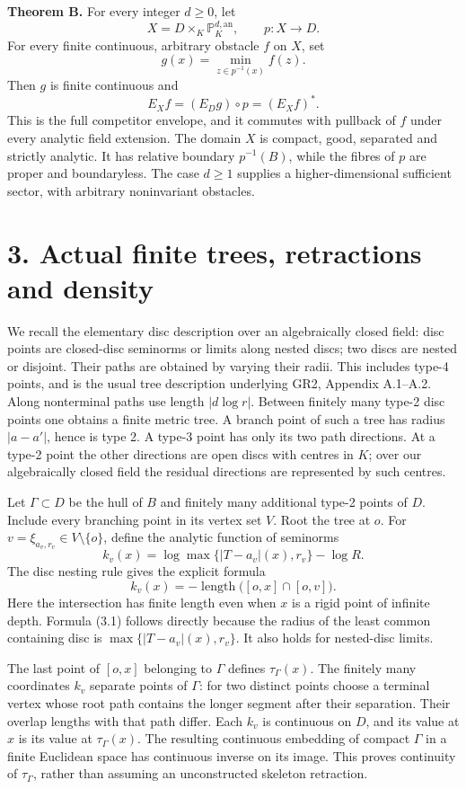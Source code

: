 \documentclass[11pt]{article}
\begin{document}
\textbf{Theorem B.} For every integer \(d\geq0\), let
\[
X=D\times_K\mathbb P^{d,\mathrm{an}}_K,\qquad p:X\to D.
\]
For every finite continuous, arbitrary obstacle \(f\) on \(X\), set
\[
g(x)=\min_{z\in p^{-1}(x)}f(z).
\]
Then \(g\) is finite continuous and
\[
E_Xf=(E_Dg)\circ p=(E_Xf)^*.
\]
This is the full competitor envelope, and it commutes with pullback of \(f\) under every analytic field extension. The domain \(X\) is compact, good, separated and strictly analytic. It has relative boundary \(p^{-1}(B)\), while the fibres of \(p\) are proper and boundaryless. The case \(d\geq1\) supplies a higher-dimensional sufficient sector, with arbitrary noninvariant obstacles.

\section*{3. Actual finite trees, retractions and density}

We recall the elementary disc description over an algebraically closed field: disc points are closed-disc seminorms or limits along nested discs; two discs are nested or disjoint. Their paths are obtained by varying their radii. This includes type-4 points, and is the usual tree description underlying GR2, Appendix A.1--A.2. Along nonterminal paths use length \(|d\log r|\). Between finitely many type-2 disc points one obtains a finite metric tree. A branch point of such a tree has radius \(|a-a'|\), hence is type 2. A type-3 point has only its two path directions. At a type-2 point the other directions are open discs with centres in \(K\); over our algebraically closed field the residual directions are represented by such centres.

Let \(\Gamma\subset D\) be the hull of \(B\) and finitely many additional type-2 points of \(D\). Include every branching point in its vertex set \(V\). Root the tree at \(o\). For \(v=\xi_{a_v,r_v}\in V\setminus\{o\}\), define the analytic function of seminorms
\[
k_v(x)=\log\max\{|T-a_v|(x),r_v\}-\log R.
\]
The disc nesting rule gives the explicit formula
\[
k_v(x)=-\operatorname{length}\bigl([o,x]\cap[o,v]\bigr).
\tag{3.1}
\]
Here the intersection has finite length even when \(x\) is a rigid point of infinite depth. Formula (3.1) follows directly because the radius of the least common containing disc is \(\max\{|T-a_v|(x),r_v\}\). It also holds for nested-disc limits.

The last point of \([o,x]\) belonging to \(\Gamma\) defines \(\tau_\Gamma(x)\). The finitely many coordinates \(k_v\) separate points of \(\Gamma\): for two distinct points choose a terminal vertex whose root path contains the longer segment after their separation. Their overlap lengths with that path differ. Each \(k_v\) is continuous on \(D\), and its value at \(x\) is its value at \(\tau_\Gamma(x)\). The resulting continuous embedding of compact \(\Gamma\) in a finite Euclidean space has continuous inverse on its image. This proves continuity of \(\tau_\Gamma\), rather than assuming an unconstructed skeleton retraction.
\end{document}
